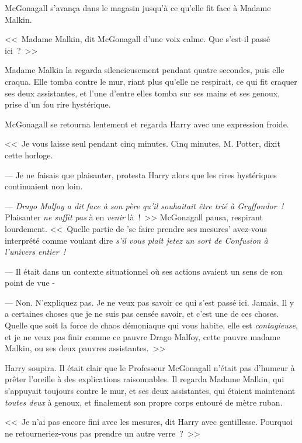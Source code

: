 McGonagall s'avança dans le magasin jusqu'à ce qu'elle fit face à Madame Malkin.

<<~Madame Malkin, dit McGonagall d'une voix calme. Que s'est-il passé ici~?~>>

Madame Malkin la regarda silencieusement pendant quatre secondes, puis elle craqua. Elle tomba contre le mur, riant plus qu'elle ne respirait, ce qui fit craquer ses deux assistantes, et l'une d'entre elles tomba sur ses mains et ses genoux, prise d'un fou rire hystérique.

McGonagall se retourna lentement et regarda Harry avec une expression froide. 

<<~Je vous laisse seul pendant cinq minutes. Cinq minutes, M. Potter, dixit cette horloge.

--- Je ne faisais que plaisanter, protesta Harry alors que les rires hystériques continuaient non loin.

--- \emph{Drago Malfoy a dit face à son père qu'il souhaitait être trié à Gryffondor~!} Plaisanter \emph{ne suffit pas} à en \emph{venir} là~!~>> McGonagall pausa, respirant lourdement. <<~Quelle partie de 'se faire prendre ses mesures' avez-vous interprété comme voulant dire \emph{s'il vous plaît jetez un sort de Confusion à l'univers entier~!}

--- Il était dans un contexte situationnel où ses actions avaient un sens de son point de vue -

--- Non. N'expliquez pas. Je ne veux pas savoir ce qui s'est passé ici. Jamais. Il y a certaines choses que je ne suis pas censée savoir, et c'est une de ces choses. Quelle que soit la force de chaos démoniaque qui vous habite, elle est \emph{contagieuse}, et je ne veux pas finir comme ce pauvre Drago Malfoy, cette pauvre madame Malkin, ou ses deux pauvres assistantes.~>>

Harry soupira. Il était clair que le Professeur McGonagall n'était pas d'humeur à prêter l'oreille à des explications raisonnables. Il regarda Madame Malkin, qui s'appuyait toujours contre le mur, et ses deux assistantes, qui étaient maintenant \emph{toutes deux} à genoux, et finalement son propre corps entouré de mètre ruban.

<<~Je n'ai pas encore fini avec les mesures, dit Harry avec gentillesse. Pourquoi ne retourneriez-vous pas prendre un autre verre~?~>>

